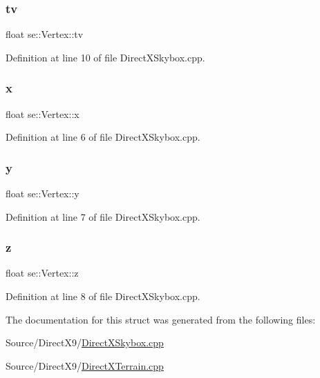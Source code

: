 \subsubsection{\texorpdfstring{tv}{tv}}
{\footnotesize\ttfamily float se\+::\+Vertex\+::tv}



Definition at line 10 of file Direct\+X\+Skybox.\+cpp.

\mbox{\label{structse_1_1_vertex_a861f929c19a2002c84cc45937af25ccd}} 
\subsubsection{\texorpdfstring{x}{x}}
{\footnotesize\ttfamily float se\+::\+Vertex\+::x}



Definition at line 6 of file Direct\+X\+Skybox.\+cpp.

\mbox{\label{structse_1_1_vertex_a6e79ab7f589edb89969385db39405297}} 
\subsubsection{\texorpdfstring{y}{y}}
{\footnotesize\ttfamily float se\+::\+Vertex\+::y}



Definition at line 7 of file Direct\+X\+Skybox.\+cpp.

\mbox{\label{structse_1_1_vertex_a2a709adb9f77c1611363a550e658983b}} 
\subsubsection{\texorpdfstring{z}{z}}
{\footnotesize\ttfamily float se\+::\+Vertex\+::z}



Definition at line 8 of file Direct\+X\+Skybox.\+cpp.



The documentation for this struct was generated from the following files\+:\begin{DoxyCompactItemize}
\item 
Source/\+Direct\+X9/\mbox{\hyperlink{_direct_x_skybox_8cpp}{Direct\+X\+Skybox.\+cpp}}\item 
Source/\+Direct\+X9/\mbox{\hyperlink{_direct_x_terrain_8cpp}{Direct\+X\+Terrain.\+cpp}}\end{DoxyCompactItemize}
